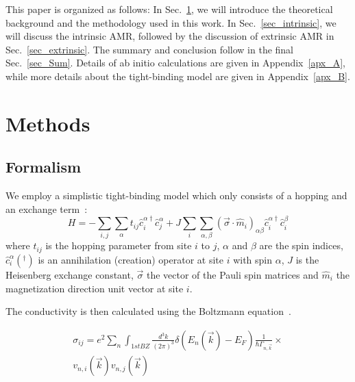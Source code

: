 \documentclass[prb,showpacs,amsmath,amssymb,superscriptaddress,twocolumn,floatfix]{revtex4-1}
\begin{document}
This paper is organized as follows: In Sec.~\ref{sec_modelling}, we
will introduce the theoretical background and the methodology used in this work. In Sec.~\ref{sec_intrinsic}, we will discuss the intrinsic AMR, followed by the discussion of extrinsic AMR in Sec.~\ref{sec_extrinsic}. The summary and conclusion follow in the final Sec.~\ref{sec_Sum}. Details of ab initio calculations are given in Appendix~\ref{apx_A}, while more details about the tight-binding model are given in Appendix~\ref{apx_B}.

\section{Methods}
\label{sec_modelling}

\subsection{Formalism}

We employ a simplistic tight-binding model which only consists of a hopping and an exchange term~\cite{Gonzalez-Hernandez:2024}:
\begin{equation}
	H = -\sum_{i, j}\sum_\alpha t_{ij} {\hat{c}_i^{\alpha\dagger}} \hat{c}^\alpha_j + J \sum_{i} \sum_{\alpha, \beta} (\vec{\sigma} \cdot \hat{m}_i)_{\alpha \beta} {\hat{c}_i^{\alpha\dagger}} \hat{c}^\beta_i 
	\label{eq_sdmodel}
\end{equation} 
where $t_{ij}$ is the hopping parameter from site $i$ to $j$, $\alpha$ and $\beta$ are the spin indices, ${\hat{c}_i^{\alpha}}(^\dagger)$ is an annihilation (creation) operator at site $i$ with spin $\alpha$, $J$ is the Heisenberg exchange constant, $\vec{\sigma}$ the vector of the Pauli spin matrices and $\hat{m}_i$ the magnetization direction unit vector at site $i$.

The conductivity is then calculated using the Boltzmann equation~\cite{Vyborny:2009}. 

\begin{multline}
	\sigma_{ij} = e^2 \sum_n  \int_ {1st BZ} \frac{d^3k}{(2\pi)^3} \delta(E_n(\vec{k}) - E_F) \frac{1}{\hbar \Gamma_{n, \vec{k}}} \times \\ v_{n,i}(\vec{k}) v_{n,j}(\vec{k})
	\label{eq_Boltzmann_1}
\end{multline}
\end{document}
